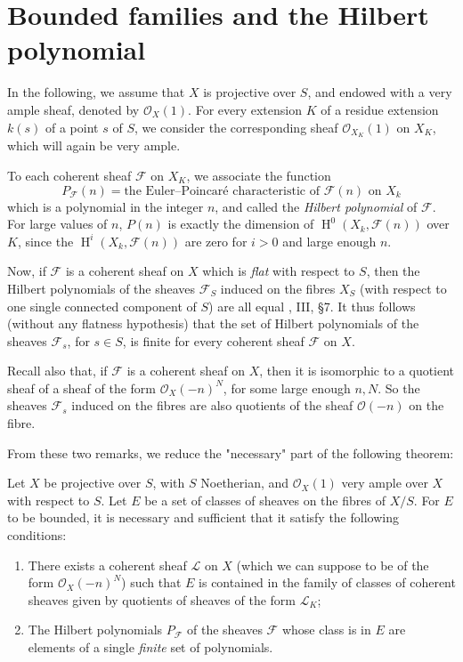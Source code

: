 \section{Bounded families and the Hilbert polynomial}\label{fga3.iv-2}



  In the following, we assume that $X$ is projective over $S$, and endowed with a very ample sheaf, denoted by $\mathcal{O}_X(1)$.
  For every extension $K$ of a residue extension $k(s)$ of a point $s$ of $S$, we consider the corresponding sheaf $\mathcal{O}_{X_K}(1)$ on $X_K$, which will again be very ample.

  To each coherent sheaf $\mathcal{F}$ on $X_K$, we associate the function
  \[
    P_\mathcal{F}(n) = \text{the Euler–Poincaré characteristic of }\mathcal{F}(n)\text{ on }X_k
  \]
  which is a polynomial in the integer $n$, and called the \emph{Hilbert polynomial} of $\mathcal{F}$.
  For large values of $n$, $P(n)$ is exactly the dimension of $\operatorname{H}^0(X_k,\mathcal{F}(n))$ over $K$, since the $\operatorname{H}^i(X_k,\mathcal{F}(n))$ are zero for $i>0$ and large enough $n$.

  Now, if $\mathcal{F}$ is a coherent sheaf on $X$ which is \emph{flat} with respect to $S$, then the Hilbert polynomials of the sheaves $\mathcal{F}_S$ induced on the fibres $X_S$ (with respect to one single connected component of $S$) are all equal \cite{GD1960}, III, §7.
  It thus follows (without any flatness hypothesis) that the set of Hilbert polynomials of the sheaves $\mathcal{F}_s$, for $s\in S$, is finite for every coherent sheaf $\mathcal{F}$ on $X$.

  Recall also that, if $\mathcal{F}$ is a coherent sheaf on $X$, then it is isomorphic to a quotient sheaf of a sheaf of the form $\mathcal{O}_X(-n)^N$, for some large enough $n,N$.
  So the sheaves $\mathcal{F}_s$ induced on the fibres are also quotients of the sheaf $\mathcal{O}(-n)$ on the fibre.

  From these two remarks, we reduce the "necessary" part of the following theorem:

\begin{theorem}\label{fga3.iv-2-theorem-2.1}
  Let $X$ be projective over $S$, with $S$ Noetherian, and $\mathcal{O}_X(1)$ very ample over $X$ with respect to $S$.
    Let $E$ be a set of classes of sheaves on the fibres of $X/S$.
    For $E$ to be bounded, it is necessary and sufficient that it satisfy the following conditions:
    \begin{enumerate}[label=\alph*.]
      \item There exists a coherent sheaf $\mathcal{L}$ on $X$ (which we can suppose to be of the form $\mathcal{O}_X(-n)^N$) such that $E$ is contained in the family of classes of coherent sheaves given by quotients of sheaves of the form $\mathcal{L}_K$;
      \item The Hilbert polynomials $P_\mathcal{F}$ of the sheaves $\mathcal{F}$ whose class is in $E$ are elements of a single \emph{finite} set of polynomials.
    \end{enumerate}
\end{theorem}

